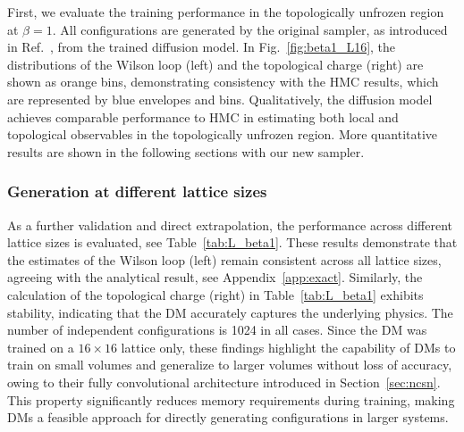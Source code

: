 \documentclass[a4paper,11pt]{article}
\begin{document}
First, we evaluate the training performance in the topologically unfrozen region at $\beta = 1$. All configurations are generated by the original sampler, as introduced in Ref.~\cite{Wang:2023exq}, from the trained diffusion model. In Fig.~\ref{fig:beta1_L16}, the distributions of the Wilson loop (left) and the topological charge (right) are shown as orange bins, demonstrating consistency with the HMC results, which are represented by blue envelopes and bins. Qualitatively, the diffusion model achieves comparable performance to HMC in estimating both local and topological observables in the topologically unfrozen region. More quantitative results are shown in the following sections with our new sampler.

\subsubsection{Generation at different lattice sizes}


As a further validation and direct extrapolation, the performance across different lattice sizes is evaluated, see Table~\ref{tab:L_beta1}. These results demonstrate that the estimates of the Wilson loop (left) remain consistent across all lattice sizes, agreeing with the analytical result, see Appendix~\ref{app:exact}. Similarly, the calculation of the topological charge (right) in Table~\ref{tab:L_beta1} exhibits stability, indicating that the DM accurately captures the underlying physics.
The number of independent configurations is 1024 in all cases.
Since the DM was trained on a $16\times 16$ lattice only, 
these findings highlight the capability of DMs to train on small volumes and generalize to larger volumes without loss of accuracy, owing to their fully convolutional architecture introduced in Section~\ref{sec:ncsn}. This property significantly reduces memory requirements during training, making DMs a feasible approach for directly generating  configurations in larger systems.

\end{document}
